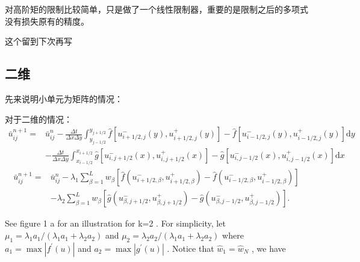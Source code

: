 \documentclass{book}
\begin{document}
对高阶矩的限制比较简单，只是做了一个线性限制器，重要的是限制之后的多项式没有损失原有的精度。

\begin{remark}
  这个留到下次再写
\end{remark}
\subsection{二维}
先来说明小单元为矩阵的情况：

对于二维的情况：
\begin{equation}
  \begin{aligned}
    \bar{u}_{i j}^{n+1}= & \bar{u}_{i j}^{n}-\frac{\Delta t}{\Delta x \Delta y} \int_{y_{j-1 / 2}}^{y_{j+1 / 2}} \hat{f}\left[u_{i+1 / 2, j}^{-}(y), u_{i+1 / 2, j}^{+}(y)\right]-\hat{f}\left[u_{i-1 / 2, j}^{-}(y), u_{i-1 / 2, j}^{+}(y)\right] \mathrm{d} y \\
                         & -\frac{\Delta t}{\Delta x \Delta y} \int_{x_{i-1 / 2}}^{x_{i+1 / 2}} \hat{g}\left[u_{i, j+1 / 2}^{-}(x), u_{i, j+1 / 2}^{+}(x)\right]-\hat{g}\left[u_{i, j-1 / 2}^{-}(x), u_{i, j-1 / 2}^{+}(x)\right] \mathrm{d} x
  \end{aligned}
\end{equation}
\begin{equation}
  \begin{aligned}
    \bar{u}_{i j}^{n+1}= & \bar{u}_{i j}^{n}-\lambda_{1} \sum_{\beta=1}^{L} w_{\beta}\left[\hat{f}\left(u_{i+1 / 2, \beta}^{-}, u_{i+1 / 2, \beta}^{+}\right)-\hat{f}\left(u_{i-1 / 2, \beta}^{-}, u_{i-1 / 2, \beta}^{+}\right)\right] \\
                         & -\lambda_{2} \sum_{\beta=1}^{L} w_{\beta}\left[\hat{g}\left(u_{\beta, j+1 / 2}^{-}, u_{\beta, j+1 / 2}^{+}\right)-\hat{g}\left(u_{\beta, j-1 / 2}^{-}, u_{\beta, j-1 / 2}^{+}\right)\right] .
  \end{aligned}
\end{equation}


See figure  1 a  for an illustration for  k=2 . For simplicity, let  $\mu_{1}=\lambda_{1} a_{1} /\left(\lambda_{1} a_{1}+\right.   \left.\lambda_{2} a_{2}\right)$  and  $\mu_{2}=\lambda_{2} a_{2} /\left(\lambda_{1} a_{1}+\lambda_{2} a_{2}\right) $ where  $a_{1}=\max \left|f^{\prime}(u)\right|$  and  $a_{2}=\max \left|g^{\prime}(u)\right|$ . Notice that  $\hat{w}_{1}=\hat{w}_{N}$ , we have
\end{document}
